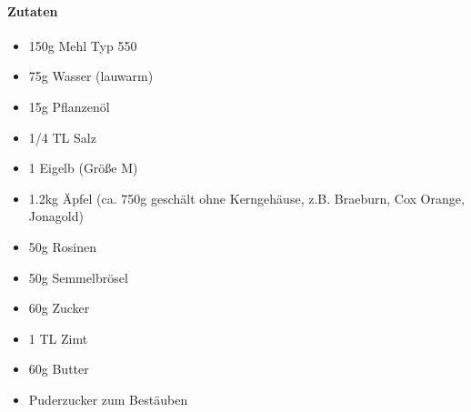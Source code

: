 \clearpage
{}

\paragraph{Zutaten}
\begin{itemize}[noitemsep]
	\item 150g Mehl Typ 550
	\item 75g Wasser (lauwarm)
	\item 15g Pflanzenöl
	\item 1/4 TL Salz
	\item 1 Eigelb (Größe M)
	\vspace{0.5cm}
	\item 1.2kg Äpfel (ca. 750g geschält ohne Kerngehäuse, z.B.  Braeburn, Cox Orange, Jonagold)
	\item 50g Rosinen
	\item 50g Semmelbrösel
	\item 60g Zucker
	\item 1 TL Zimt
	\item 60g Butter
	\item Puderzucker zum Bestäuben
\end{itemize}


